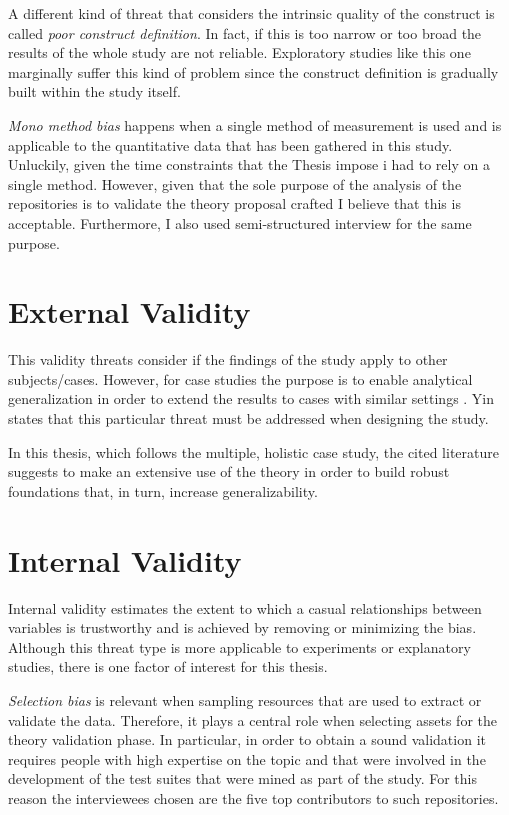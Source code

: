     A different kind of threat that considers the intrinsic quality of the construct is called \textit{poor construct definition}. In fact, if this is too narrow or too broad the results of the whole study are not reliable. Exploratory studies like this one marginally suffer this kind of problem since the construct definition is gradually built within the study itself.

    \textit{Mono method bias} happens when a single method of measurement is used and is applicable to the quantitative data that has been gathered in this study. Unluckily, given the time constraints that the Thesis impose i had to rely on a single method. However, given that the sole purpose of the analysis of the repositories is to validate the theory proposal crafted I believe that this is acceptable. Furthermore, I also used semi-structured interview for the same purpose.

\section{External Validity}
This validity threats consider if the findings of the study apply to other subjects/cases. However, for case studies the purpose is to enable analytical generalization in order to extend the results to cases with similar settings \cite{case_study_software_engineering}. Yin \cite{case_study_guide} states that this particular threat must be addressed when designing the study.

In this thesis, which follows the multiple, holistic case study, the cited literature suggests to make an extensive use of the theory in order to build robust foundations that, in turn, increase generalizability.


\section{Internal Validity}
Internal validity estimates the extent to which a casual relationships between variables is trustworthy and is achieved by removing or minimizing the bias. Although this threat type is more applicable to experiments or explanatory studies, there is one factor of interest for this thesis.

\textit{Selection bias} is relevant when sampling resources that are used to extract or validate the data. Therefore, it plays a central role when selecting assets for the theory validation phase. In particular, in order to obtain a sound validation it requires people with high expertise on the topic and that were involved in the development of the test suites that were mined as part of the study. For this reason the interviewees chosen are the five top contributors to such repositories.


